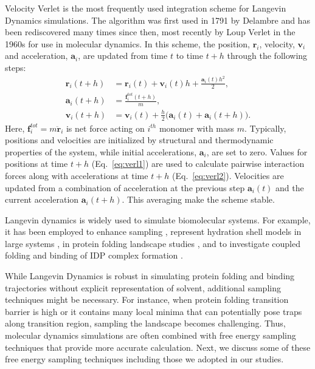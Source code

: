\documentclass[../talant.diss.submit.tex]{subfiles}
\begin{document}
Velocity Verlet is the most frequently used integration scheme for Langevin Dynamics simulations.
The algorithm was first used in 1791 by Delambre and has been rediscovered many times since then,
most recently by Loup Verlet in the 1960s for use in molecular dynamics.
In this scheme, the position, $\bm{r}_i$, velocity, $\bm{v}_i$ and  acceleration, $\bm{a}_i$, are
updated from time $t$ to time $t+h$ through the following steps:
%
%
\begin{align}
  \label{eq:verl1}
  \bm{r}_{i}(t+h) &= \bm{r}_{i}(t) + \bm{v}_{i}(t)h + \frac{\bm{a}_{i}(t)h^2}{2},  \\
  \label{eq:verl2}
  \bm{a}_{i}(t+h) &= \frac{\bm{f}_{i}^{tot}(t+h)}{m}, \\
  \label{eq:verl3}
  \bm{v}_{i}(t+h) &= \bm{v}_{i}(t) +  \frac{h}{2} \big( \bm{a}_{i}(t) + \bm{a}_{i}(t+h) \big).  
\end{align}
%
Here, $\bm{f}_{i}^{tot} = m\ddot{\bm{r}}_i$ is net force acting on $i^{th}$ monomer with mass $m$.
Typically, positions and velocities are initialized by structural and
thermodynamic properties of the system, while initial accelerations, $\bm{a}_i$, are set to zero.
Values for positions at time $t+h$ (Eq.~\ref{eq:verl1}) are used to calculate pairwise interaction
forces along with accelerations at time $t+h$ (Eq.~\ref{eq:verl2}).
Velocities are updated from a combination of acceleration at the previous step $\bm{a}_i(t)$
and the current acceleration $\bm{a}_i(t+h)$. This averaging make the scheme stable.

Langevin dynamics is widely used to simulate biomolecular systems.
For example, it has been employed to enhance sampling
\cite{doniach:99p,hao:93u}, represent hydration shell models in large systems
\cite{beglov:95d,beglov:95n}, in protein folding landscape studies
\cite{koga:01,karanicolas:03,cheung:02,kouza:06,jefferys:10p,eaton:17t,},
and to investigate coupled folding and binding of IDP complex formation
\cite{knott:14,huang:10a,huang:10,ganguly:11,de-sancho:12,cao:16,umezawa:16}.

While Langevin Dynamics is robust in simulating protein folding and binding
trajectories without explicit representation of solvent, additional sampling
techniques might be necessary.  For instance, when protein folding transition
barrier is high or it contains many local minima that can potentially pose traps
along transition region, sampling the landscape becomes challenging. Thus,
molecular dynamics simulations are often combined with free energy sampling
techniques that provide more accurate calculation. Next, we discuss some of
these free energy sampling techniques including those we adopted in our studies.
\end{document}
